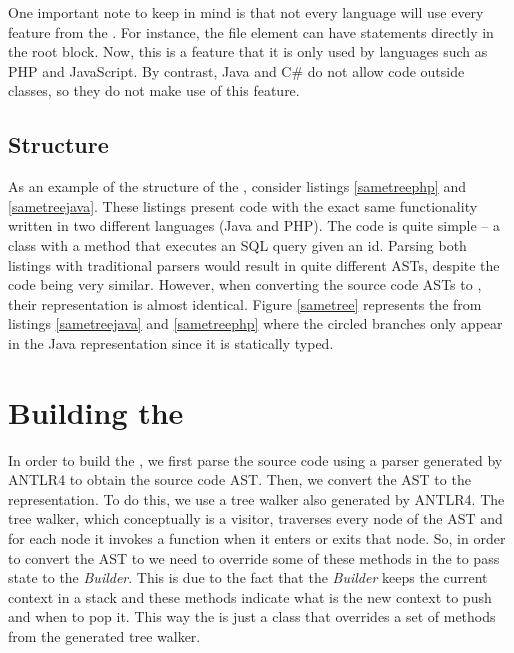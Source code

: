 One important note to keep in mind is that not every language will use every feature from the \astname{}. For instance, the file element can have statements directly in the root block. Now, this is a feature that it is only used by languages such as PHP and JavaScript. By contrast, Java and C\# do not allow code outside classes, so they do not make use of this feature. 

\subsection{Structure}
As an example of the structure of the \astname{}, consider listings \ref{sametreephp} and \ref{sametreejava}. These listings present code with the exact same functionality written in two different languages (Java and PHP). The code is quite simple -- a class with a method that executes an SQL query given an id. 
Parsing both listings with traditional parsers would result in quite different ASTs, despite the code being very similar. However, when converting the source code ASTs to \astname{}, their representation is almost identical. Figure \ref{sametree} represents the \astname{} from listings \ref{sametreejava} and \ref{sametreephp} where the circled branches only appear in the Java representation since it is statically typed.




\section{Building the \astname{}}
\label{buildgenericast}

In order to build the \astname{}, we first parse the source code using a parser generated by ANTLR4 to obtain the source code AST. Then, we convert the AST to the \astname{} representation. To do this, we use a tree walker also generated by ANTLR4. The tree walker, which conceptually is a visitor, traverses every node of the AST and for each node it invokes a function when it enters or exits that node. So, in order to convert the AST to \astname{} we need to override some of these methods in the \converter{} to pass state to the \textit{\astname{} Builder}. This is due to the fact that the \textit{\astname{} Builder} keeps the current context in a stack and these methods indicate what is the new context to push and when to pop it. This way the \converter{} is just a class that overrides a set of methods from the generated tree walker. 

